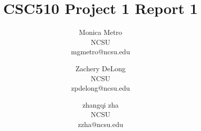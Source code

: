 \documentclass{article}
\begin{document}
\title{CSC510 Project 1 Report 1}
\date{} %

\author{{\large Monica Metro}\\NCSU\\mgmetro@ncsu.edu \and {\large Zachery DeLong}\\NCSU\\zpdelong@ncsu.edu \and {\large zhangqi zha}\\NCSU\\zzha@ncsu.edu }

\maketitle


















\end{document}

